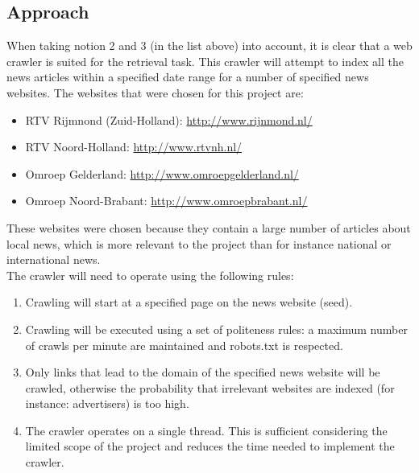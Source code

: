 \subsection*{Approach}
When taking notion 2 and 3 (in the list above) into account, it is clear that a web crawler is suited for the retrieval task. This crawler will attempt to index all the news articles within a specified date range for a number of specified news websites. The websites that were chosen for this project are:
\begin{itemize}[noitemsep]
\item RTV Rijmnond (Zuid-Holland): \url{http://www.rijnmond.nl/}
\item RTV Noord-Holland: \url{http://www.rtvnh.nl/}
\item Omroep Gelderland: \url{http://www.omroepgelderland.nl/}
\item Omroep Noord-Brabant: \url{http://www.omroepbrabant.nl/}
\end{itemize}
These websites were chosen because they contain a large number of articles about local news, which is more relevant to the project than for instance national or international news.\\
The crawler will need to operate using the following rules:
\begin{enumerate}
\item Crawling will start at a specified page on the news website (seed).
\item Crawling will be executed using a set of politeness rules: a maximum number of crawls per minute are maintained and robots.txt is respected.
\item Only links that lead to the domain of the specified news website will be crawled, otherwise the probability that irrelevant websites are indexed (for instance: advertisers) is too high.
\item The crawler operates on a single thread. This is sufficient considering the limited scope of the project and reduces the time needed to implement the crawler.
\end{enumerate}
